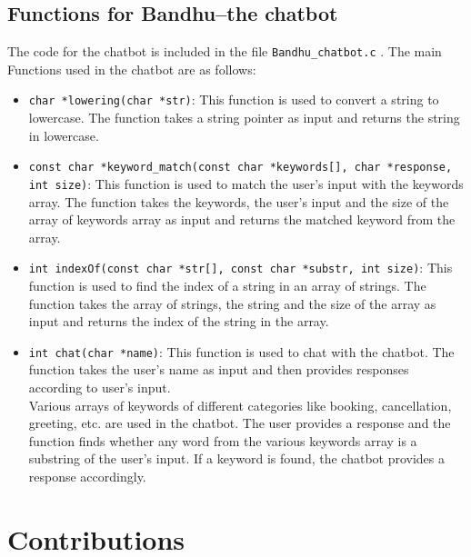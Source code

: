 \documentclass[a4paper]{scrartcl}
\begin{document}
\subsection{Functions for Bandhu--the chatbot}
The code for the chatbot is included in the file  \texttt{Bandhu\_chatbot.c} . The main Functions used in the chatbot are as follows: 

\noindent
    
\begin{itemize}
    \item \texttt{char *lowering(char *str)}: This function is used to convert a string to lowercase. The function takes a string pointer as input and returns the string in lowercase.
    \item \texttt{const char *keyword\_match(const char *keywords[], char *response, int size)}: This function is used to match the user's input with the keywords array. The function takes the keywords, the user's input and the size of the array of keywords array as input and returns the matched keyword from the array.
    \item \texttt{int indexOf(const char *str[], const char *substr, int size)}: This function is used to find the index of a string in an array of strings. The function takes the array of strings, the string and the size of the array as input and returns the index of the string in the array.
    \item \texttt{int chat(char *name)}: This function is used to chat with the chatbot. The function takes the user's name as input and then provides responses according to user's input.\\
    Various arrays of keywords of different categories like booking, cancellation, greeting, etc. are used in the chatbot. The user provides a response and the function finds whether any word from the various keywords array is a substring of the user's input. If a keyword is found, the chatbot provides a response accordingly.
\end{itemize}
        

\section{Contributions}
\end{document}
